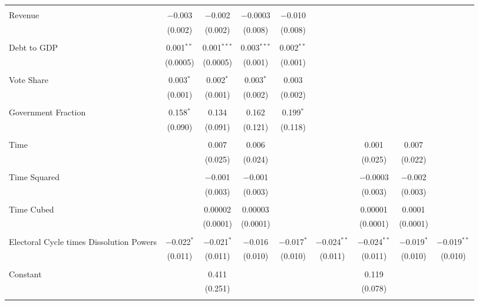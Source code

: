 \begin{table}[!htbp]
\begin{tabular}{@{\extracolsep{5pt}}lcccccccc}
  & & & & & & & & \\ 
 Revenue & $-$0.003 & $-$0.002 & $-$0.0003 & $-$0.010 &  &  &  &  \\ 
  & (0.002) & (0.002) & (0.008) & (0.008) &  &  &  &  \\ 
  & & & & & & & & \\ 
 Debt to GDP & 0.001$^{**}$ & 0.001$^{***}$ & 0.003$^{***}$ & 0.002$^{**}$ &  &  &  &  \\ 
  & (0.0005) & (0.0005) & (0.001) & (0.001) &  &  &  &  \\ 
  & & & & & & & & \\ 
 Vote Share & 0.003$^{*}$ & 0.002$^{*}$ & 0.003$^{*}$ & 0.003 &  &  &  &  \\ 
  & (0.001) & (0.001) & (0.002) & (0.002) &  &  &  &  \\ 
  & & & & & & & & \\ 
 Government Fraction & 0.158$^{*}$ & 0.134 & 0.162 & 0.199$^{*}$ &  &  &  &  \\ 
  & (0.090) & (0.091) & (0.121) & (0.118) &  &  &  &  \\ 
  & & & & & & & & \\ 
 Time &  & 0.007 & 0.006 &  &  & 0.001 & 0.007 &  \\ 
  &  & (0.025) & (0.024) &  &  & (0.025) & (0.022) &  \\ 
  & & & & & & & & \\ 
 Time Squared &  & $-$0.001 & $-$0.001 &  &  & $-$0.0003 & $-$0.002 &  \\ 
  &  & (0.003) & (0.003) &  &  & (0.003) & (0.003) &  \\ 
  & & & & & & & & \\ 
 Time Cubed &  & 0.00002 & 0.00003 &  &  & 0.00001 & 0.0001 &  \\ 
  &  & (0.0001) & (0.0001) &  &  & (0.0001) & (0.0001) &  \\ 
  & & & & & & & & \\ 
 Electoral Cycle times Dissolution Powers & $-$0.022$^{*}$ & $-$0.021$^{*}$ & $-$0.016 & $-$0.017$^{*}$ & $-$0.024$^{**}$ & $-$0.024$^{**}$ & $-$0.019$^{*}$ & $-$0.019$^{**}$ \\ 
  & (0.011) & (0.011) & (0.010) & (0.010) & (0.011) & (0.011) & (0.010) & (0.010) \\ 
  & & & & & & & & \\ 
 Constant &  & 0.411 &  &  &  & 0.119 &  &  \\ 
  &  & (0.251) &  &  &  & (0.078) &  &  \\ 
  & & & & & & & & \\ 

\end{tabular}
\end{table}
